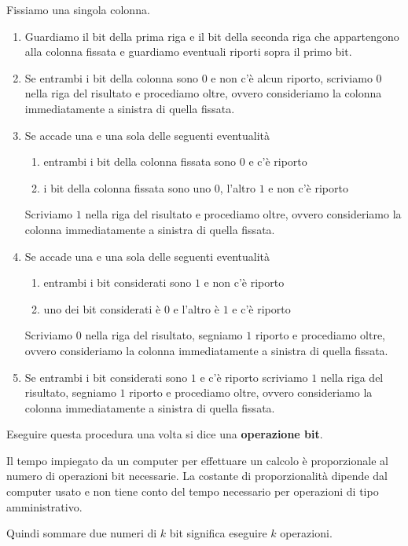\documentclass[a4paper,12pt, oneside]{book}
\begin{document}
		\begin{algoritmo}
			Fissiamo una singola colonna.
			\begin{enumerate}
				\item Guardiamo il bit della prima riga e il bit della seconda riga che appartengono alla colonna fissata e guardiamo eventuali riporti sopra il primo bit.
				\item Se entrambi i bit della colonna sono $0$ e non c'è alcun riporto, scriviamo $0$ nella riga del risultato e procediamo oltre, ovvero consideriamo la colonna immediatamente a sinistra di quella fissata.
				\item Se accade una e una sola delle seguenti eventualità
					\begin{enumerate}
						\item entrambi i bit della colonna fissata sono $0$ e c'è riporto
						\item i bit della colonna fissata sono uno $0$, l'altro $1$ e non c'è riporto
					\end{enumerate}
					Scriviamo $1$ nella riga del risultato e procediamo oltre, ovvero consideriamo la colonna immediatamente a sinistra di quella fissata.
				\item Se accade una e una sola delle seguenti eventualità
					\begin{enumerate}
						\item entrambi i bit considerati sono $1$ e non c'è riporto
						\item uno dei bit considerati è $0$ e l'altro è $1$ e c'è riporto
					\end{enumerate}
					Scriviamo $0$ nella riga del risultato, segniamo $1$ riporto e procediamo oltre, ovvero consideriamo la colonna immediatamente a sinistra di quella fissata.
				\item Se entrambi i bit considerati sono $1$ e c'è riporto scriviamo $1$ nella riga del risultato, segniamo $1$ riporto e procediamo oltre, ovvero consideriamo la colonna immediatamente a sinistra di quella fissata.
			\end{enumerate}
		\end{algoritmo}
		Eseguire questa procedura una volta si dice una \textbf{operazione bit}.
		\begin{nota}
			Il tempo impiegato da un computer per effettuare un calcolo è proporzionale al numero di operazioni bit necessarie. La costante di proporzionalità dipende dal computer usato e non tiene conto del tempo necessario per operazioni di tipo amministrativo.
		\end{nota}
		Quindi sommare due numeri di $k$ bit significa eseguire $k$ operazioni.
\end{document}
